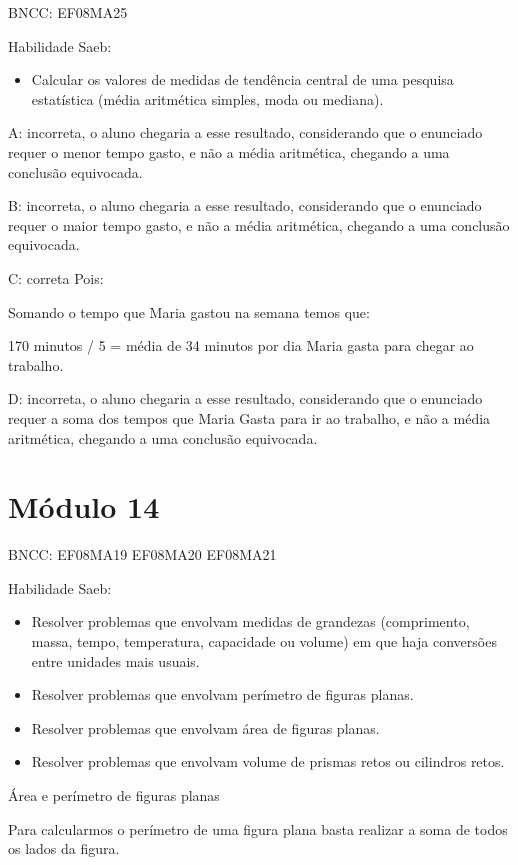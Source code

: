 BNCC: EF08MA25

Habilidade Saeb:

\begin{itemize}
\tightlist
\item
  Calcular os valores de medidas de tendência central de uma pesquisa
  estatística (média aritmética simples, moda ou mediana).
\end{itemize}

A: incorreta, o aluno chegaria a esse resultado, considerando que o
enunciado requer o menor tempo gasto, e não a média aritmética, chegando
a uma conclusão equivocada.

B: incorreta, o aluno chegaria a esse resultado, considerando que o
enunciado requer o maior tempo gasto, e não a média aritmética, chegando
a uma conclusão equivocada.

C: correta Pois:

Somando o tempo que Maria gastou na semana temos que:

170 minutos / 5 = média de 34 minutos por dia Maria gasta para chegar ao
trabalho.

D: incorreta, o aluno chegaria a esse resultado, considerando que o
enunciado requer a soma dos tempos que Maria Gasta para ir ao trabalho,
e não a média aritmética, chegando a uma conclusão equivocada.

\section{Módulo 14}

BNCC: EF08MA19 EF08MA20 EF08MA21

Habilidade Saeb:

\begin{itemize}
\item
  Resolver problemas que envolvam medidas de grandezas (comprimento,
  massa, tempo, temperatura, capacidade ou volume) em que haja
  conversões entre unidades mais usuais.
\item
  Resolver problemas que envolvam perímetro de figuras planas.
\item
  Resolver problemas que envolvam área de figuras planas.
\item
  Resolver problemas que envolvam volume de prismas retos ou cilindros
  retos.
\end{itemize}

Área e perímetro de figuras planas

Para calcularmos o perímetro de uma figura plana basta realizar a soma
de todos os lados da figura.

